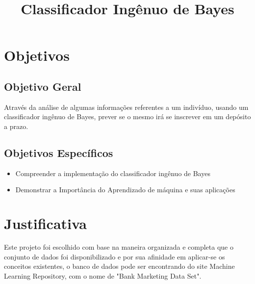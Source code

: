 \documentclass[conference]{IEEEtran}
\begin{document}
\title{Classificador Ingênuo de Bayes}

\author{
\and
{}
\and
{}

}

\maketitle





\section{Objetivos}
\subsection{Objetivo Geral}
Através da análise de algumas informações referentes a um indivíduo, usando um classificador ingênuo de Bayes, prever se o mesmo irá se inscrever em um depósito a prazo. 
\subsection{Objetivos Específicos}
\begin{itemize}
\item Compreender a implementação do classificador ingênuo de Bayes
\item Demonstrar a Importância do Aprendizado de máquina e suas aplicações
\end{itemize}
\section{Justificativa}
Este projeto foi escolhido com base na maneira organizada e completa que o conjunto de dados  foi disponibilizado e por sua afinidade em aplicar-se os conceitos existentes, o banco de dados pode ser encontrando do site Machine Learning Repository, com o nome de "Bank Marketing Data Set"\cite{b1}.
\end{document}
